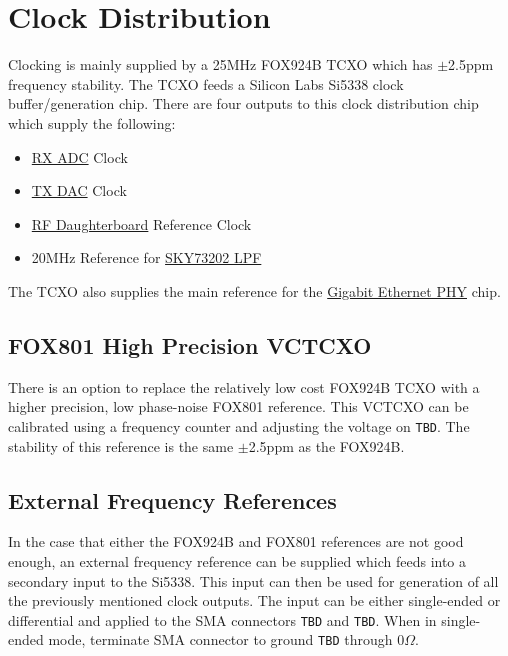 \section{Clock Distribution} %
\label{sec:clock}

    Clocking is mainly supplied by a 25MHz FOX924B TCXO which has $\pm$2.5ppm frequency stability.
    The TCXO feeds a Silicon Labs Si5338 clock buffer/generation chip.  There are four outputs
    to this clock distribution chip which supply the following:
    
    \begin{itemize}
        \item \hyperref[sec:adc]{RX ADC} Clock
        \item \hyperref[sec:dac]{TX DAC} Clock
        \item \hyperref[sec:db]{RF Daughterboard} Reference Clock
        \item 20MHz Reference for \hyperref[sec:sky73202]{SKY73202 LPF}
    \end{itemize}
    
    The TCXO also supplies the main reference for the \hyperref[sec:gige]{Gigabit Ethernet PHY} chip.
        
    \subsection{FOX801 High Precision VCTCXO} %
        There is an option to replace the relatively low cost FOX924B TCXO with a higher precision,
        low phase-noise FOX801 reference.  This VCTCXO can be calibrated using a frequency counter
        and adjusting the voltage on \texttt{TBD}.  The stability of this reference is the same
        $\pm$2.5ppm as the FOX924B.
    
    \subsection{External Frequency References} %
        In the case that either the FOX924B and FOX801 references are not good enough, an external
        frequency reference can be supplied which feeds into a secondary input to the Si5338.
        This input can then be used for generation of all the previously mentioned clock outputs.
        The input can be either single-ended or differential and applied to the SMA connectors \texttt{TBD}
        and \texttt{TBD}.  When in single-ended mode, terminate SMA connector to ground \texttt{TBD} 
        through $0\Omega$.
    
